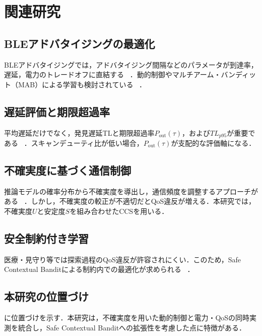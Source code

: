 \section{関連研究}

\subsection{BLEアドバタイジングの最適化}

BLEアドバタイジングでは，アドバタイジング間隔などのパラメータが到達率，遅延，電力のトレードオフに直結する~
．動的制御やマルチアーム・バンディット（MAB）による学習も検討されている~
．

\subsection{遅延評価と期限超過率}

平均遅延だけでなく，発見遅延TLと期限超過率$P_{\mathrm{out}}(\tau)$，および$TL_{p95}$が重要である~
．スキャンデューティ比が低い場合，$P_{\mathrm{out}}(\tau)$が支配的な評価軸になる．

\subsection{不確実度に基づく通信制御}

推論モデルの確率分布から不確実度を導出し，通信頻度を調整するアプローチがある~
．しかし，不確実度の較正が不適切だとQoS違反が増える．本研究では，不確実度$U$と安定度$S$を組み合わせたCCSを用いる．

\subsection{安全制約付き学習}

医療・見守り等では探索過程のQoS違反が許容されにくい．このため，Safe Contextual Banditによる制約内での最適化が求められる~
．

\subsection{本研究の位置づけ}

に位置づけを示す．本研究は，不確実度を用いた動的制御と電力・QoSの同時実測を統合し，Safe Contextual Banditへの拡張性を考慮した点に特徴がある．

